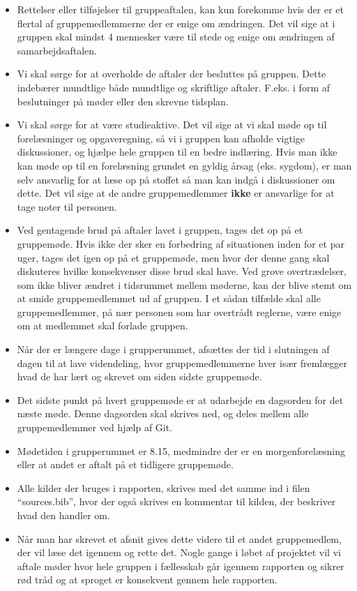 \documentclass[hidelinks, 12pt]{article}
\begin{document}
	\begin{itemize}
		\item Rettelser eller tilføjelser til gruppeaftalen, kan kun forekomme hvis der er et flertal af gruppemedlemmerne der er enige om ændringen. Det vil sige at i gruppen skal mindst 4 mennesker være til stede og enige om ændringen af samarbejdsaftalen.
		\item Vi skal sørge for at overholde de aftaler der besluttes på gruppen. Dette indebærer mundtlige både mundtlige og skriftlige aftaler. F.eks. i form af beslutninger på møder eller den skrevne tidsplan.
		\item Vi skal sørge for at være studieaktive. Det vil sige at vi skal møde op til forelæsninger og opgaveregning, så vi i gruppen kan afholde vigtige diskussioner, og hjælpe hele gruppen til en bedre indlæring. Hvis man ikke kan møde op til en forelæsning grundet en gyldig årsag (eks. sygdom), er man selv ansvarlig for at læse op på stoffet så man kan indgå i diskussioner om dette. Det vil sige at de andre gruppemedlemmer \textbf{ikke} er ansvarlige for at tage noter til personen.
		\item Ved gentagende brud på aftaler lavet i gruppen, tages det op på et gruppemøde. Hvis ikke der sker en forbedring af situationen inden for et par uger, tages det igen op på et gruppemøde, men hvor der denne gang skal diskuteres hvilke konsekvenser disse brud skal have. Ved grove overtrædelser, som ikke bliver ændret i tidsrummet mellem møderne, kan der blive stemt om at smide gruppemedlemmet ud af gruppen. I et sådan tilfælde skal alle gruppemedlemmer, på nær personen som har overtrådt reglerne, være enige om at medlemmet skal forlade gruppen.
		\item Når der er længere dage i grupperummet, afsættes der tid i slutningen af dagen til at lave videndeling, hvor gruppemedlemmerne hver især fremlægger hvad de har lært og skrevet om siden sidste gruppemøde.
		\item Det sidste punkt på hvert gruppemøde er at udarbejde en dagsorden for det næste møde. Denne dagsorden skal skrives ned, og deles mellem alle gruppemedlemmer ved hjælp af Git.
		\item Mødetiden i grupperummet er 8.15, medmindre der er en morgenforelæsning eller at andet er aftalt på et tidligere gruppemøde.
		\item Alle kilder der bruges i rapporten, skrives med det samme ind i filen ``sources.bib'', hvor der også skrives en kommentar til kilden, der beskriver hvad den handler om. 
		\item Når man har skrevet et afsnit gives dette videre til et andet gruppemedlem, der vil læse det igennem og rette det. Nogle gange i løbet af projektet vil vi aftale møder hvor hele gruppen i fællesskab går igennem rapporten og sikrer rød tråd og at sproget er konsekvent gennem hele rapporten.

\end{itemize}
\end{document}
